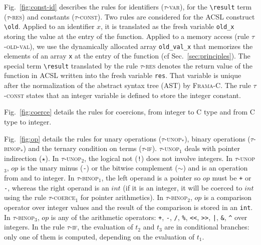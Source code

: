 Fig.~\ref{fig:const-id} describes the rules for identifiers
(\textsc{$\tau$-var}), for the \lstinline|\result| term
(\textsc{$\tau$-res}) and constants (\textsc{$\tau$-const}).
Two rules are considered for the ACSL construct \lstinline|\old|.
Applied to an identifier $x$, it is translated as the fresh variable
\lstinline|old_x| storing the value at the entry of the function.
Applied to a memory access (rule \textsc{$\tau$-old-val}), we use the dynamically
allocated array \lstinline|old_val_x| that memorizes the elements of an array
\lstinline|x| at the entry of the function (cf Sec.~\ref{sec:principles}).
The special term \lstinline|\result| translated by the rule
\textsc{$\tau$-res} denotes the return value of the function in
\textsc{ACSL} written into the fresh variable   \lstinline|res|.
That variable is unique after the normalization of the abstract syntax tree (AST) by
\textsc{Frama-C}. 
The rule \textsc{$\tau$-const} states that an integer variable is defined to
store the integer constant.

Fig.~\ref{fig:coerce} details the rules for coercions, from integer to C type
and from C type to integer.

Fig.~\ref{fig:op} details the rules for unary operations
(\textsc{$\tau$-unop$_*$}),
binary operations (\textsc{$\tau$-binop$_*$}) and the ternary condition on terms
(\textsc{$\tau$-if}).
\textsc{$\tau$-unop$_1$} deals with pointer indirection ($\star$).
In \textsc{$\tau$-unop$_2$}, the logical not (\lstinline|!|) does not involve
integers.
In \textsc{$\tau$-unop$_3$}, $op$ is the unary minus (\lstinline|-|) or the
bitwise complement ($\sim$) and is an operation from and to integer.
In \textsc{$\tau$-binop$_1$}, the left operand is a pointer so $op$ must be
\lstinline|+| or \lstinline|-|, whereas the right operand is an $int$
(if it is an integer, it will be coerced to $int$ using the rule
\textsc{$\tau$-coerce$_1$} for pointer arithmetics).
In \textsc{$\tau$-binop$_2$}, $op$ is a comparison operator over integer values
and the result of the comparison is stored in an \lstinline|int|.
In \textsc{$\tau$-binop$_3$}, $op$ is any of the arithmetic
operators: \lstinline|+|, \lstinline|-|, \lstinline|/|, \lstinline|%|,
\lstinline|<<|, \lstinline|>>|, \lstinline{|}, \lstinline|&|, \lstinline|^|
over integers.
In the rule \textsc{$\tau$-if}, the evaluation of $t_2$ and $t_3$ are in
conditional branches: only one of them is computed, depending on the evaluation
of $t_1$.






